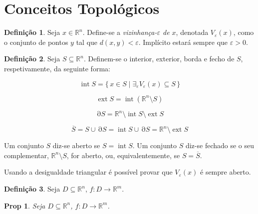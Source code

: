 \documentclass{article}
\DeclareMathOperator{\interior}{int}
\DeclareMathOperator{\exterior}{ext}
\DeclareMathOperator{\border}{\partial}
\newcommand{\R}{\mathbb{R}}
\newtheorem{prop}{Prop}
\theoremstyle{definition}
\newtheorem*{definition*}{Definição}
\begin{document}
	\section{Conceitos Topológicos}
	
	\begin{definition*}
	Seja $x \in \R^n$. Define-se a \emph{vizinhança-$\varepsilon$ de $x$}, denotada $V_\varepsilon(x)$, como o conjunto de pontos $y$ tal que $d(x, y) < \varepsilon$. Implícito estará sempre que $\varepsilon > 0$.
	\end{definition*}
	
	\begin{definition*}
	Seja $S \subseteq \R^n$. Definem-se o interior, exterior, borda e fecho de $S$, respetivamente, da seguinte forma:
	
	\[\interior S = \{\, x \in S \mid \exists_\varepsilon V_\varepsilon (x) \subseteq S\,\}\]
	
	\[\exterior S = \interior (\R^n \setminus S)\]
	
	\[\border S = \R^n \setminus \interior S \setminus \exterior S\]
	
	\[\overline S = S \cup \border S = \interior S \cup \border S = \R^n \setminus \exterior S\]
	
	Um conjunto $S$ diz-se aberto se $S = \interior S$. Um conjunto $S$ diz-se fechado se o seu complementar, $\R^n \setminus S$, for aberto, ou, equivalentemente, se $S = \overline S$.
	
	Usando a desigualdade triangular é possível provar que $V_\varepsilon(x)$ é sempre aberto.
	\end{definition*}
	
	\begin{definition*}
	Seja $D \subseteq \R^n$, $f : D \to \R^m$.
	\end{definition*}
	
	\begin{prop}
	Seja $D \subseteq \R^n$, $f : D \to \R^m$.
	\end{prop}
	
\end{document}
